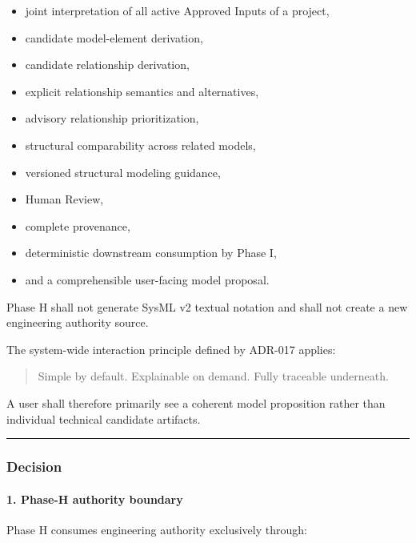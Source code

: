\begin{itemize}
\tightlist
\item
  joint interpretation of all active Approved Inputs of a project,
\item
  candidate model-element derivation,
\item
  candidate relationship derivation,
\item
  explicit relationship semantics and alternatives,
\item
  advisory relationship prioritization,
\item
  structural comparability across related models,
\item
  versioned structural modeling guidance,
\item
  Human Review,
\item
  complete provenance,
\item
  deterministic downstream consumption by Phase I,
\item
  and a comprehensible user-facing model proposal.
\end{itemize}

Phase H shall not generate SysML v2 textual notation and shall not create a new engineering authority source.

The system-wide interaction principle defined by ADR-017 applies:

\begin{quote}
Simple by default. Explainable on demand. Fully traceable underneath.
\end{quote}

A user shall therefore primarily see a coherent model proposition rather than individual technical candidate artifacts.

\begin{center}\rule{0.5\linewidth}{0.5pt}\end{center}

\hypertarget{decision-3}{%
\subsubsection{Decision}\label{decision-3}}

\hypertarget{1-phase-h-authority-boundary}{%
\paragraph{1. Phase-H authority boundary}\label{1-phase-h-authority-boundary}}

Phase H consumes engineering authority exclusively through:

